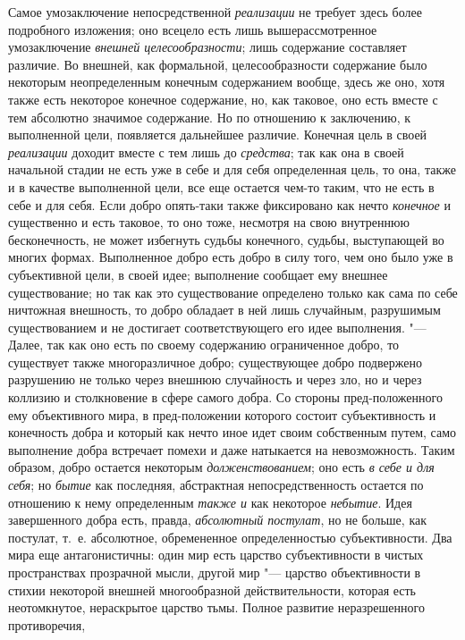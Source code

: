 Самое умозаключение непосредственной
{\em реализации} не
требует здесь более подробного изложения; оно всецело есть лишь
вышерассмотренное умозаключение
{\em внешней целесообразности};
лишь содержание составляет различие. Во внешней, как
формальной, целесообразности содержание было некоторым неопределенным
конечным содержанием вообще, здесь же оно, хотя также есть некоторое
конечное содержание, но, как таковое, оно есть вместе с тем абсолютно
значимое содержание. Но по отношению к заключению, к выполненной цели,
появляется дальнейшее различие. Конечная цель в своей
{\em реализации} доходит
вместе с тем лишь до {\em средства};
так как она в своей начальной стадии не есть уже в себе и для
себя определенная цель, то она, также и в качестве выполненной цели, все
еще остается чем-то таким, что не есть в себе и для себя. Если добро
опять-таки также фиксировано как нечто
{\em конечное} и
существенно и есть таковое, то оно тоже, несмотря на свою внутреннюю
бесконечность, не может избегнуть судьбы конечного, судьбы, выступающей во
многих формах. Выполненное добро есть добро в силу того, чем оно было уже в
субъективной цели, в своей идее; выполнение сообщает ему внешнее
существование; но так как это существование определено только как сама по
себе ничтожная внешность, то добро обладает в ней лишь случайным,
разрушимым существованием и не достигает соответствующего его идее
выполнения. "--- Далее, так как оно есть по своему содержанию
ограниченное добро, то существует также многоразличное добро; существующее
добро подвержено разрушению не только через внешнюю случайность и через
зло, но и через коллизию и столкновение в сфере самого добра. Со стороны
пред-положенного ему объективного мира, в пред-положении которого состоит
субъективность и конечность добра и который как нечто иное идет своим
собственным путем, само выполнение добра встречает помехи и даже натыкается
на невозможность. Таким образом, добро остается некоторым
{\em долженствованием};
оно есть {\em в себе и для
себя}; но {\em бытие}
как последняя, абстрактная непосредственность остается по
отношению к нему определенным {\em также
и} как некоторое
{\em небытие}. Идея
завершенного добра есть, правда,
{\em абсолютный постулат},
но не больше, как постулат, т.~е. абсолютное, обремененное
определенностью субъективности. Два мира еще антагонистичны: один мир есть
царство субъективности в чистых пространствах прозрачной мысли, другой мир
"--- царство объективности в стихии некоторой внешней
многообразной действительности, которая есть неотомкнутое, нераскрытое
царство тьмы. Полное развитие неразрешенного противоречия,
